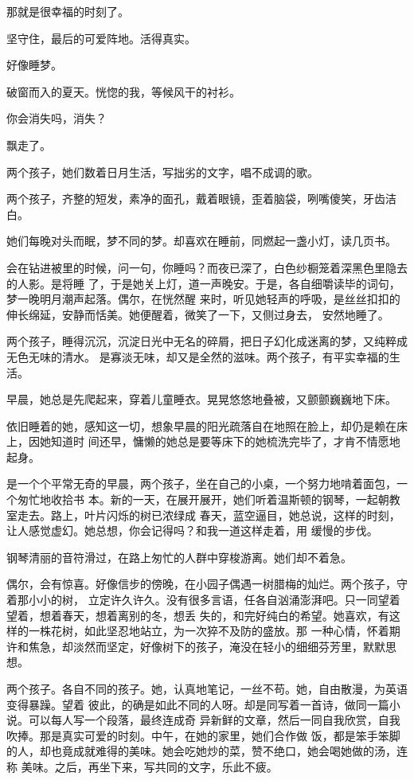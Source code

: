 		那就是很幸福的时刻了。

		坚守住，最后的可爱阵地。活得真实。

		好像睡梦。

		破窗而入的夏天。恍惚的我，等候风干的衬衫。

		你会消失吗，消失？

		飘走了。

	\endwriting



		两个孩子，她们数着日月生活，写拙劣的文字，唱不成调的歌。

		两个孩子，齐整的短发，素净的面孔，戴着眼镜，歪着脑袋，咧嘴傻笑，牙齿洁白。

		她们每晚对头而眠，梦不同的梦。却喜欢在睡前，同燃起一盏小灯，读几页书。

		会在钻进被里的时候，问一句，你睡吗？而夜已深了，白色纱橱笼着深黑色里隐去的人影。是将睡
	了，于是她关上灯，道一声晚安。于是，各自细嚼读毕的词句，梦一晚明月潮声起落。偶尔，在恍然醒
	来时，听见她轻声的呼吸，是丝丝扣扣的伸长绵延，安静而恬美。她便醒着，微笑了一下，又侧过身去，
	安然地睡了。

		两个孩子，睡得沉沉，沉淀日光中无名的碎屑，把日子幻化成迷离的梦，又纯粹成无色无味的清水。
	是寡淡无味，却又是全然的滋味。两个孩子，有平实幸福的生活。

		早晨，她总是先爬起来，穿着儿童睡衣。晃晃悠悠地叠被，又颤颤巍巍地下床。

		依旧睡着的她，感知这一切，想象早晨的阳光疏落自在地照在脸上，却仍是赖在床上，因她知道时
	间还早，慵懒的她总是要等床下的她梳洗完毕了，才肯不情愿地起身。

		是一个个平常无奇的早晨，两个孩子，坐在自己的小桌，一个努力地啃着面包，一个匆忙地收拾书
	本。新的一天，在展开展开，她们听着温斯顿的钢琴，一起朝教室走去。路上，叶片闪烁的树已浓绿成
	春天，蓝空逼目，她总说，这样的时刻，让人感觉虚幻。她总想，你会记得吗？和我一道这样走着，用
	缓慢的步伐。

		钢琴清丽的音符滑过，在路上匆忙的人群中穿梭游离。她们却不着急。

		偶尔，会有惊喜。好像信步的傍晚，在小园子偶遇一树腊梅的灿烂。两个孩子，守着那小小的树，
	立定许久许久。没有很多言语，任各自汹涌澎湃吧。只一同望着望着，想着春天，想着离别的冬，想丢
	失的，和完好纯白的希望。她喜欢，有这样的一株花树，如此坚忍地站立，为一次猝不及防的盛放。那
	一种心情，怀着期许和焦急，却淡然而坚定，好像树下的孩子，淹没在轻小的细细芬芳里，默默思想。

		两个孩子。各自不同的孩子。她，认真地笔记，一丝不苟。她，自由散漫，为英语变得暴躁。望着
	彼此，的确是如此不同的人呀。却是同写着一首诗，做同一篇小说。可以每人写一个段落，最终连成奇
	异新鲜的文章，然后一同自我欣赏，自我吹捧。那是真实可爱的时刻。中午，在她的家里，她们合作做
	饭，都是笨手笨脚的人，却也竟成就难得的美味。她会吃她炒的菜，赞不绝口，她会喝她做的汤，连称
	美味。之后，再坐下来，写共同的文字，乐此不疲。

